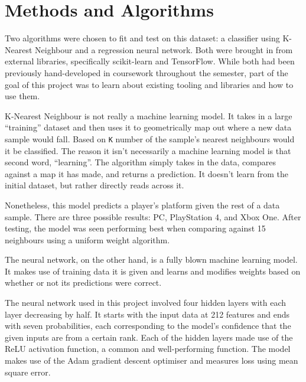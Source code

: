 \documentclass[12pt]{article}
\begin{document}
\section{Methods and Algorithms}
Two algorithms were chosen to fit and test on this dataset: a classifier using K-Nearest Neighbour and a regression neural network.
Both were brought in from external libraries, specifically scikit-learn and TensorFlow.
While both had been previously hand-developed in coursework throughout the semester, part of the goal of this project was to learn about existing tooling and libraries and how to use them.

K-Nearest Neighbour is not really a machine learning model.
It takes in a large ``training'' dataset and then uses it to geometrically map out where a new data sample would fall.
Based on \verb`K` number of the sample's nearest neighbours would it be classified.
The reason it isn't necessarily a machine learning model is that second word, ``learning''.
The algorithm simply takes in the data, compares against a map it has made, and returns a prediction.
It doesn't learn from the initial dataset, but rather directly reads across it.

Nonetheless, this model predicts a player's platform given the rest of a data sample.
There are three possible results: PC, PlayStation 4, and Xbox One.
After testing, the model was seen performing best when comparing against 15 neighbours using a uniform weight algorithm.

The neural network, on the other hand, is a fully blown machine learning model.
It makes use of training data it is given and learns and modifies weights based on whether or not its predictions were correct.

The neural network used in this project involved four hidden layers with each layer decreasing by half.
It starts with the input data at 212 features and ends with seven probabilities, each corresponding to the model's confidence that the given inputs are from a certain rank.
Each of the hidden layers made use of the ReLU activation function, a common and well-performing function.
The model makes use of the Adam gradient descent optimiser and measures loss using mean square error.

\newpage


\end{document}
